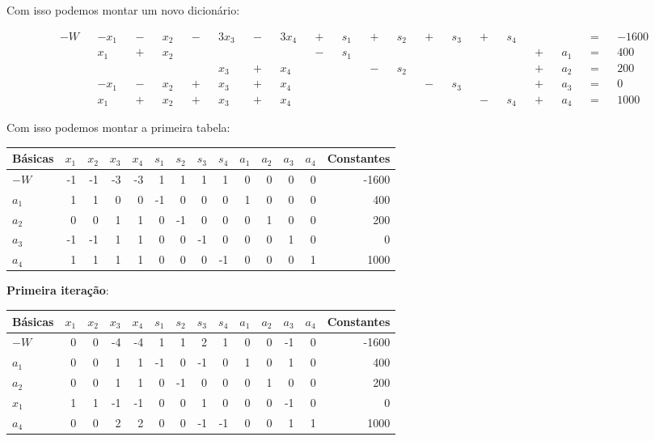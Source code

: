 \documentclass[12pt, a4paper]{article}
\begin{document}
Com isso podemos montar um novo dicionário:

\begin{align*}
  -W &&- x_1 &&-&& x_2 &&-&& 3x_3 &&-&& 3x_4 &&+&& s_1&&+&&s_2&&+&&s_3&&+&&s_4&& && &&=&& -1600 \\
  && x_1 &&+&& x_2 && && && && &&-&& s_1 && && && && && && &&+&& a_1 &&=&& 400 \\
  && && && && && x_3 &&+&& x_4 && && &&-&& s_2 && && && && &&+&& a_2 &&=&& 200 \\
  &&-x_1 &&-&& x_2 &&+&& x_3 &&+&& x_4 && && && && &&-&& s_3 && && &&+&& a_3 &&=&& 0 \\
  && x_1 &&+&& x_2 &&+&& x_3 &&+&& x_4 && && && && && && &&-&& s_4 &&+&& a_4 &&=&& 1000
\end{align*}

Com isso podemos montar a primeira tabela:

\begin{table}[htb]
  \centering
  \begin{tabular}{lrrrrrrrrrrrrr}
    \toprule
    Básicas & $x_1$ & $x_2$ & $x_3$ & $x_4$ & $s_1$ & $s_2$ & $s_3$ & $s_4$ & $a_1$ & $a_2$ & $a_3$ & $a_4$ & Constantes \\
    \midrule
    $-W$  & -1 & -1 & -3 & -3 &  1 &  1 &  1 &  1 & 0 & 0 & 0 & 0 & -1600 \\
    $a_1$ &  1 &  1 &  0 &  0 & -1 &  0 &  0 &  0 & 1 & 0 & 0 & 0 & 400 \\
    $a_2$ &  0 &  0 &  1 &  1 &  0 & -1 &  0 &  0 & 0 & 1 & 0 & 0 & 200 \\
    $a_3$ & -1 & -1 &  1 &  1 &  0 &  0 & -1 &  0 & 0 & 0 & 1 & 0 & 0 \\
    $a_4$ &  1 &  1 &  1 &  1 &  0 &  0 &  0 & -1 & 0 & 0 & 0 & 1 & 1000 \\
    \bottomrule
  \end{tabular}
\end{table}

\textbf{Primeira iteração}:
\begin{center}
\begin{tabular}{lrrrrrrrrrrrrr}
\toprule
Básicas & $x_1$ & $x_2$ & $x_3$ & $x_4$ & $s_1$ & $s_2$ & $s_3$ & $s_4$ & $a_1$ & $a_2$ & $a_3$ & $a_4$ & Constantes \\
\midrule
$-W$ & 0 & 0 & -4 & -4 & 1 & 1 & 2 & 1 & 0 & 0 & -1 & 0 & -1600 \\
$a_1$ & 0 & 0 & 1 & 1 & -1 & 0 & -1 & 0 & 1 & 0 & 1 & 0 & 400 \\
$a_2$ & 0 & 0 & 1 & 1 & 0 & -1 & 0 & 0 & 0 & 1 & 0 & 0 & 200 \\
$x_1$ & 1 & 1 & -1 & -1 & 0 & 0 & 1 & 0 & 0 & 0 & -1 & 0 & 0 \\
$a_4$ & 0 & 0 & 2 & 2 & 0 & 0 & -1 & -1 & 0 & 0 & 1 & 1 & 1000 \\
\bottomrule
\end{tabular}
\end{center}
\end{document}
